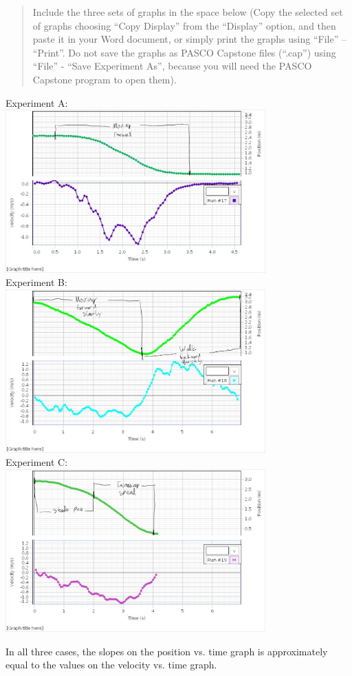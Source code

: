 \documentclass[8pt]{extarticle}
\begin{document}
{\begin{quote}
	Include the three sets of graphs in the space below (Copy the selected set of graphs choosing “Copy Display” from the “Display” option, and then paste it in your Word document, or simply print the graphs using “File” – “Print”. Do not save the graphs as PASCO Capstone files (“.cap”) using “File” - “Save Experiment As”, because you will need the PASCO Capstone program to open them).
\end{quote}
\pagebreak 
\begin{center}
	Experiment A: \\
	\includegraphics[width=10cm]{Lab2Image1_2_1}\\
	Experiment B:\\
	\includegraphics[width=10cm]{Lab2Image1_2_2}\\
	Experiment C: \\
	\includegraphics[width=10cm]{Lab2Image1_2_3}
\end{center}
In all three cases, the slopes on the position vs. time graph is approximately equal to the values on the velocity vs. time graph.
}
\end{document}

